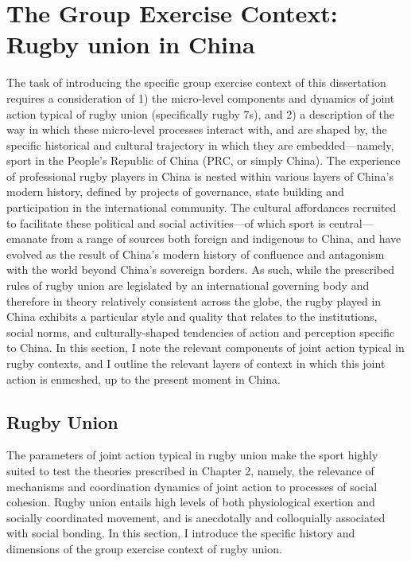 \section{The Group Exercise Context: Rugby union in China}
The task of introducing the specific group exercise context of this dissertation requires a consideration of 1) the micro-level components and dynamics of joint action typical of rugby union (specifically rugby 7s), and 2) a description of the way in which these micro-level processes interact with, and are shaped by, the specific historical and cultural trajectory in which they are embedded---namely, sport in the People's Republic of China (PRC, or simply China).  The experience of professional rugby players in China is nested within various layers of China's modern history, defined by projects of governance, state building and participation in the international community.  The cultural affordances recruited to facilitate these political and social activities---of which sport is central---emanate from a range of sources both foreign and indigenous to China, and have evolved as the result of China's modern history of confluence and antagonism with the world beyond China's sovereign borders.  As such, while the prescribed rules of rugby union are legislated by an international governing body and therefore in theory relatively consistent across the globe, the rugby played in China exhibits a particular style and quality that relates to the institutions, social norms, and culturally-shaped tendencies of action and perception specific to China. In this section, I note the relevant components of joint action typical in rugby contexts, and I outline the relevant layers of context in which this joint action is enmeshed, up to the present moment in China.

  \subsection{Rugby Union}

The parameters of joint action typical in rugby union make the sport highly suited to test the theories prescribed in Chapter 2, namely, the relevance of mechanisms and coordination dynamics of joint action to processes of social cohesion.  Rugby union entails high levels of both physiological exertion and socially coordinated movement, and is anecdotally and colloquially associated with social bonding.  In this section, I introduce the specific history and dimensions of the group exercise context of rugby union.

